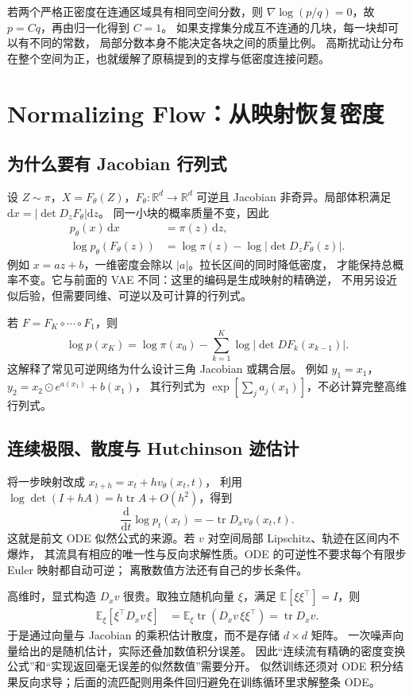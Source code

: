 若两个严格正密度在连通区域具有相同空间分数，则
$\nabla\log(p/q)=0$，故 $p=Cq$，再由归一化得到 $C=1$。
如果支撑集分成互不连通的几块，每一块却可以有不同的常数，
局部分数本身不能决定各块之间的质量比例。
高斯扰动让分布在整个空间为正，也就缓解了原稿提到的支撑与低密度连接问题。

\section{Normalizing Flow：从映射恢复密度}
\subsection{为什么要有 Jacobian 行列式}
设 $Z\sim\pi$，$X=F_\theta(Z)$，$F_\theta:\mathbb R^d\to\mathbb R^d$
可逆且 Jacobian 非奇异。局部体积满足
$\mathrm dx=|\det D_zF_\theta|\mathrm dz$。
同一小块的概率质量不变，因此
\begin{align}
p_\theta(x)\,\mathrm dx&=\pi(z)\,\mathrm dz,\\
\log p_\theta(F_\theta(z))
 &=\log\pi(z)-\log|\det D_zF_\theta(z)|.
\end{align}
例如 $x=az+b$，一维密度会除以 $|a|$。拉长区间的同时降低密度，
才能保持总概率不变。它与前面的 VAE 不同：这里的编码是生成映射的精确逆，
不用另设近似后验，但需要同维、可逆以及可计算的行列式。

若 $F=F_K\circ\cdots\circ F_1$，则
\[
\log p(x_K)=\log\pi(x_0)
 -\sum_{k=1}^K\log|\det D F_k(x_{k-1})|.
\]
这解释了常见可逆网络为什么设计三角 Jacobian 或耦合层。
例如 $y_1=x_1$，$y_2=x_2\odot e^{a(x_1)}+b(x_1)$，
其行列式为 $\exp[\sum_j a_j(x_1)]$，不必计算完整高维行列式。

\subsection{连续极限、散度与 Hutchinson 迹估计}
将一步映射改成 $x_{t+h}=x_t+h v_\theta(x_t,t)$，
利用 $\log\det(I+hA)=h\operatorname{tr}A+O(h^2)$，得到
\[
\frac{\mathrm d}{\mathrm dt}\log p_t(x_t)
=-\operatorname{tr}D_xv_\theta(x_t,t).
\]
这就是前文 ODE 似然公式的来源。若 $v$ 对空间局部 Lipschitz、轨迹在区间内不爆炸，
其流具有相应的唯一性与反向求解性质。ODE 的可逆性不要求每个有限步 Euler 映射都自动可逆；
离散数值方法还有自己的步长条件。

高维时，显式构造 $D_xv$ 很贵。取独立随机向量 $\xi$，满足
$\mathbb E[\xi\xi^\top]=I$，则
\begin{align}
\mathbb E_\xi[\xi^\top D_xv\,\xi]
 &=\mathbb E_\xi\operatorname{tr}(D_xv\,\xi\xi^\top)
 =\operatorname{tr}D_xv.
\end{align}
于是通过向量与 Jacobian 的乘积估计散度，而不是存储 $d\times d$ 矩阵。
一次噪声向量给出的是随机估计，实际还叠加数值积分误差。
因此“连续流有精确的密度变换公式”和“实现返回毫无误差的似然数值”需要分开。
似然训练还须对 ODE 积分结果反向求导；后面的流匹配则用条件回归避免在训练循环里求解整条 ODE。

